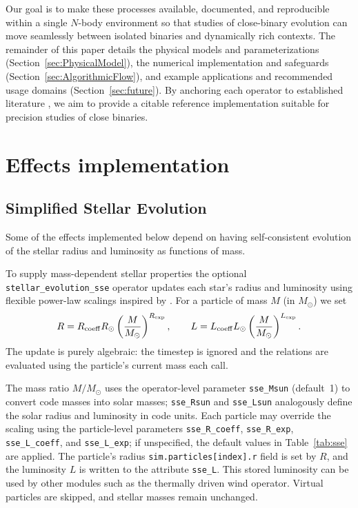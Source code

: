\documentclass[11pt]{article}
\begin{document}
Our goal is to make these processes available, documented, and reproducible within a single $N$-body environment so that studies of close-binary evolution can move seamlessly between isolated binaries and dynamically rich contexts. The remainder of this paper details the physical models and parameterizations (Section~\ref{sec:PhysicalModel}), the numerical implementation and safeguards (Section~\ref{sec:AlgorithmicFlow}), and example applications and recommended usage domains (Section~\ref{sec:future}). By anchoring each operator to established literature \citep{Eggleton1983,Ritter1988,Reimers1975,Verbunt1981,Kawaler1988,Peters1964,Kidder1995,Hurley2000,Ostriker1999}, we aim to provide a citable reference implementation suitable for precision studies of close binaries.



\section{Effects implementation}


\subsection{Simplified Stellar Evolution}
\label{sec:sse}
Some of the effects implemented below depend on having self-consistent evolution of the stellar radius and luminosity as functions of mass.

To supply mass-dependent stellar properties the optional
\texttt{stellar\_evolution\_sse} operator updates each star's radius and
luminosity using flexible power-law scalings inspired by \citet{Hurley2000}. For a
particle of mass $M$ (in $M_\odot$) we set
\[
R = R_{\rm coeff} R_\odot \left(\frac{M}{M_\odot}\right)^{R_{\rm exp}},\qquad
L = L_{\rm coeff} L_\odot \left(\frac{M}{M_\odot}\right)^{L_{\rm exp}}.
\]
The update is purely algebraic: the timestep is ignored and the relations are evaluated using the particle's current mass each call.

The mass ratio $M/M_\odot$ uses the operator-level parameter
\texttt{sse\_Msun} (default 1) to convert code masses into solar masses;
\texttt{sse\_Rsun} and \texttt{sse\_Lsun} analogously define the solar radius
and luminosity in code units.  Each particle may override the scaling using the
particle-level parameters \texttt{sse\_R\_coeff}, \texttt{sse\_R\_exp},
\texttt{sse\_L\_coeff}, and \texttt{sse\_L\_exp}; if unspecified, the default
values in Table~\ref{tab:sse} are applied.  The particle's radius \texttt{sim.particles[index].r} field is set by $R$, and the luminosity $L$ is written to the attribute
\texttt{sse\_L}. This stored luminosity can be used by other modules such as
the thermally driven wind operator. Virtual particles are skipped, and stellar
masses remain unchanged.
\end{document}

